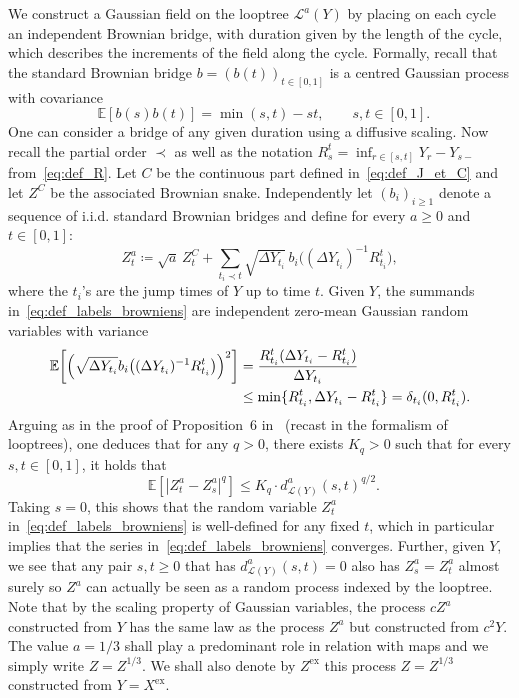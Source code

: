 \documentclass[british, a4paper,11pt]{article}
\numberwithin{equation}{section}
\theoremstyle{definition}
\newcommand{\E}{\mathop{}\!\mathbb{E}}
\newcommand{\Loop}{\mathscr{L}}
\newcommand{\exc}{\mathrm{ex}}
\begin{document}
We construct a Gaussian field on the looptree $\Loop^a(Y)$ by placing on each cycle an independent Brownian bridge, with duration given by the length of the cycle, which describes the increments of the field along the cycle. 
Formally, recall that the standard Brownian bridge $b = (b(t))_{t \in [0,1]}$ is a centred Gaussian process with covariance
\[\E[b(s) b(t)] = \min(s,t) - st,
\qquad s,t \in [0,1].\]
One can consider a bridge of any given duration using a diffusive scaling.
Now recall the partial order $\prec$ as well as the notation $R^t_s = \inf_{r \in [s,t]} Y_r - Y_{s-}$ from~\eqref{eq:def_R}. 
Let $C$ be the continuous part defined in~\eqref{eq:def_J_et_C} and let $Z^C$ be the associated Brownian snake. Independently let $(b_i)_{i \geq 1}$ denote a sequence of i.i.d. standard Brownian bridges
and define for every $a\ge0$ and $t \in [0,1]$:
\begin{equation}\label{eq:def_labels_browniens}
Z^a_t \coloneqq \sqrt{a}\, Z^C_t + \sum_{t_i \prec t} \sqrt{\Delta Y_{t_i}}\, b_i\bigl((\Delta Y_{t_i})^{-1} R^t_{t_i}\bigr),
\end{equation}
where the $t_i$'s are the jump times of $Y$ up to time $t$.
Given $Y$, the summands in~\eqref{eq:def_labels_browniens} are independent zero-mean Gaussian random variables with variance
\begin{align*}
\E\biggl[\Bigl(\sqrt{\Delta Y_{t_i}} b_i\bigl((\Delta Y_{t_i})^{-1} R^t_{t_i}\bigr)\Bigr)^2\biggr]
&= \frac{R^t_{t_i} (\Delta Y_{t_i} - R^t_{t_i})}{\Delta Y_{t_i}}
\\
&\leq \min\{R^t_{t_i}, \Delta Y_{t_i} - R^t_{t_i}\}
= \delta_{t_i}(0, R^t_{t_i}).
\end{align*}
Arguing as in the proof of Proposition~6 in~\cite{LGM11} (recast in the formalism of looptrees), one deduces that for any $q>0$, there exists $K_q > 0$ such that for every $s, t \in [0,1]$, it holds that
\begin{equation}\label{eq:label_moment_Kolmogorov_looptrees}
\E[|Z^a_t-Z^a_s|^q] \leq K_q \cdot d^a_{\Loop(Y)}(s,t)^{q/2}.
\end{equation}
Taking $s=0$, this shows that the random variable $Z^a_t$ in~\eqref{eq:def_labels_browniens} is well-defined for any fixed $t$, which in particular implies that the series in~\eqref{eq:def_labels_browniens} converges.
Further, given $Y$, we see that any pair $s,t \geq 0$ that has $d^a_{\Loop(Y)}(s,t) = 0$ also has $Z^a_s = Z^a_t$ almost surely so $Z^a$ can actually be seen as a random process indexed by the looptree. 
Note that by the scaling property of Gaussian variables, the process $c Z^a$ constructed from $Y$ has the same law as the process $Z^a$ but constructed from $c^2 Y$.
The value $a=1/3$ shall play a predominant role in relation with maps and we simply write $Z = Z^{1/3}$. We shall also denote by $Z^{\exc}$ this process $Z=Z^{1/3}$ constructed from 
$Y = X^{\exc}$.
\end{document}
